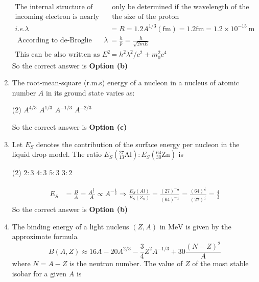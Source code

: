 \begin{enumerate}
\begin{answer}
$$\begin{aligned}
\text{The internal structure of proton can}&\text{ only be determined if the wavelength of the }\\
\text{incoming electron is nearly equal to}&\text{  the size of the proton}\\
	i.e. \lambda&=R=1.2 A^{1 / 3}(\mathrm{fm})=1.2 \mathrm{fm}=1.2 \times 10^{-15} \mathrm{~m}\\
\text{	According to de-Broglie relation,} \lambda&=\frac{h}{p}=\frac{h}{\sqrt{2 m E}}\\
	\text{This can be also written as }E^2&=h^2 \lambda^2 / c^2+m_0^2 c^4
\end{aligned}
$$
	So the correct answer is \textbf{Option (b)}
\end{answer}
	\item The root-mean-square (r.m.s) energy of a nucleon in a nucleus of atomic number $A$ in its ground state varies as:
	 \begin{tasks}(2)
		\task[\textbf{a.}] $A^{4 / 3}$
		\task[\textbf{b.}]$A^{1 / 3}$
		\task[\textbf{c.}]$A^{-1 / 3}$
		\task[\textbf{d.}] $A^{-2 / 3}$
	\end{tasks}
\begin{answer}
	So the correct answer is \textbf{Option (c)}
\end{answer}
	\item Let $E_S$ denotes the contribution of the surface energy per nucleon in the liquid drop model. The ratio $E_S\left({ }_{13}^{27} \mathrm{Al}\right): E_S\left({ }_{30}^{64} \mathrm{Zn}\right)$ is
	 \begin{tasks}(2)
		\task[\textbf{a.}]$2: 3$
		\task[\textbf{b.}] $4: 3$
		\task[\textbf{c.}]$5: 3$
		\task[\textbf{d.}]  $3: 2$
	\end{tasks}
\begin{answer}
	$$
	\begin{aligned}
	E_S&=\frac{B}{A}=\frac{A^{\frac{2}{3}}}{A} \propto A^{-\frac{1}{3}} \Rightarrow \frac{E_S(A l)}{E_S\left(Z_n\right)}=\frac{(27)^{-\frac{1}{3}}}{(64)^{-\frac{1}{3}}}=\frac{(64)^{\frac{1}{3}}}{(27)^{\frac{1}{3}}}=\frac{4}{3}
\end{aligned}
$$
	So the correct answer is \textbf{Option (b)}
\end{answer}
	\item The binding energy of a light nucleus $(Z, A)$ in $\mathrm{MeV}$ is given by the approximate formula
	$$
	B(A, Z) \approx 16 A-20 A^{2 / 3}-\frac{3}{4} Z^2 A^{-1 / 3}+30 \frac{(N-Z)^2}{A}
	$$
	where $N=A-Z$ is the neutron number. The value of $Z$ of the most stable isobar for a given $A$ is

\end{enumerate}

